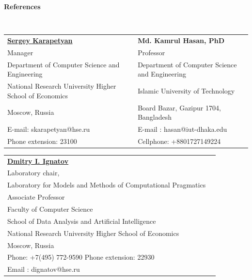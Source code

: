 \documentclass[letterpaper,10pt]{article}
\newcommand{\resheading}[1]{{\large \colorbox{mygrey}{\begin{minipage}{\textwidth}{\textbf{#1 \vphantom{p\^{E}}}}\end{minipage}}}}
\begin{document}
\resheading{References}\\


\vspace{0.1in}

\begin{tabular*} {7in} {l@{\extracolsep{\fill}}l}
\textbf{\large \href{https://www.hse.ru/en/org/persons/222507810}{Sergey Karapetyan}}  & \textbf{Md. Kamrul Hasan, PhD}\\
Manager & Professor\\
Department of Computer Science and Engineering & Department of Computer Science and Engineering \\
National Research University Higher School of Economics & Islamic University of Technology\\
Moscow, Russia &  Board Bazar, Gazipur 1704, Bangladesh\\
E-mail: skarapetyan@hse.ru &  E-mail : hasan@iut-dhaka.edu\\
Phone extension: 23100 & Cellphone: +8801727149224
\end{tabular*}

\vspace{0.1in}

\begin{tabular*} {7in} {l@{\extracolsep{\fill}}l}
\textbf{\large \href{https://www.hse.ru/en/staff/dima}{Dmitry I. Ignatov} }   \\

Laboratory chair,  \\
Laboratory for Models and Methods of Computational Pragmatics \\
Associate Professor \\
Faculty of Computer Science \\
School of Data Analysis and Artificial Intelligence \\
National Research University Higher School of Economics \\
Moscow, Russia \\ 
Phone: +7(495) 772-9590 Phone extension: 22930 \\
Email : dignatov@hse.ru \\
\end{tabular*}




\end{document}
